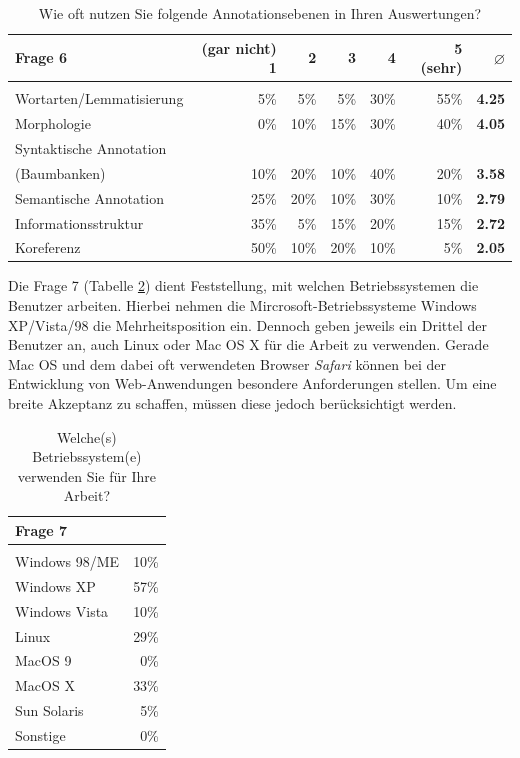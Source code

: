 	\begin{table}[H]
		\centering
		\begin{tabular}{l | r r r r r | r}
					Frage 6 & (gar nicht) 1 & 2 & 3 & 4 & 5 (sehr) & \bf{$\varnothing$}	\\
					\hline\\
					Wortarten/Lemmatisierung	& 5\% &   5\%        & 5\%             & 30\%       & 55\% & \bf{4.25} \\
					Morphologie				& 0\% &   10\%      & 15\%             & 30\%       & 40\% & \bf{4.05} \\
					Syntaktische Annotation\\ (Baumbanken)	 & 10\% &   20\%        & 10\%             & 40\%       & 20\% & \bf{3.58} \\
					Semantische Annotation		& 25\% &   20\%        & 10\%             & 30\%       & 10\% & \bf{2.79} \\
					Informationsstruktur			& 35\% &   5\%        & 15\%             & 20\%       & 15\% & \bf{2.72} \\
					Koreferenz				& 50\% &   10\%        & 20\%             & 10\%       & 5\% & \bf{2.05}
		\end{tabular}
		\caption{Wie oft nutzen Sie folgende Annotationsebenen in Ihren Auswertungen?}\label{tab:Frage6}
	\end{table}

Die Frage 7 (Tabelle \ref{tab:Frage7}) dient Feststellung, mit welchen Betriebssystemen die Benutzer arbeiten. Hierbei nehmen die Mircrosoft-Betriebssysteme Windows XP/Vista/98 die Mehrheitsposition ein. Dennoch geben jeweils ein Drittel der Benutzer an, auch Linux oder Mac OS X für die Arbeit zu verwenden. Gerade Mac OS und dem dabei oft verwendeten Browser \emph{Safari} können bei der Entwicklung von Web-Anwendungen besondere Anforderungen stellen. Um eine breite Akzeptanz zu schaffen, müssen diese jedoch berücksichtigt werden.
	
	\begin{table}[H]
		\centering
		\begin{tabular}{l | r}
			 		Frage 7 & \\
					\hline\\
					Windows 98/ME	& 10\% \\
					Windows XP 		& 57\% \\
					Windows Vista		& 10\% \\
					Linux 			& 29\% \\
					MacOS 9			& 0\% \\
					MacOS X			& 33\% \\
					Sun Solaris		& 5\% \\
					Sonstige			& 0\%
					
		\end{tabular}
		\caption{Welche(s) Betriebssystem(e) verwenden Sie für Ihre Arbeit?}\label{tab:Frage7}
	\end{table}

